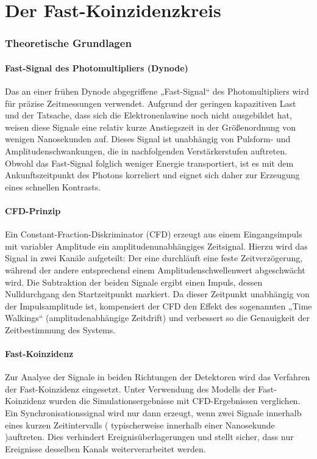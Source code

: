 \chapter{Der Fast-Koinzidenzkreis}
\subsection{Theoretische Grundlagen}
\subsubsection{Fast-Signal des Photomultipliers (Dynode)}
Das an einer frühen Dynode abgegriffene „Fast-Signal“ des Photomultipliers wird für präzise Zeitmessungen verwendet. Aufgrund der geringen kapazitiven Last und der Tatsache, dass sich die Elektronenlawine noch nicht ausgebildet hat, weisen diese Signale eine relativ kurze Anstiegszeit in der Größenordnung von wenigen Nanosekunden auf. Dieses Signal ist unabhängig von Pulsform- und Amplitudenschwankungen, die in nachfolgenden Verstärkerstufen auftreten. Obwohl das Fast-Signal folglich weniger Energie transportiert, ist es mit dem Ankunftszeitpunkt des Photons korreliert und eignet sich daher zur Erzeugung eines schnellen Kontrasts.
\subsubsection{CFD-Prinzip}
Ein Constant-Fraction-Diskriminator (CFD) erzeugt aus einem Eingangsimpuls mit variabler Amplitude ein amplitudenunabhängiges Zeitsignal. Hierzu wird das Signal in zwei Kanäle aufgeteilt: Der eine durchläuft eine feste Zeitverzögerung, während der andere entsprechend einem Amplitudenschwellenwert abgeschwächt wird. Die Subtraktion der beiden Signale ergibt einen Impuls, dessen Nulldurchgang den Startzeitpunkt markiert. Da dieser Zeitpunkt unabhängig von der Impulsamplitude ist, kompensiert der CFD den Effekt des sogenannten „Time Walkings“ (amplitudenabhängige Zeitdrift) und verbessert so die Genauigkeit der Zeitbestimmung des Systems.
\subsubsection{Fast-Koinzidenz}
Zur Analyse der Signale in beiden Richtungen der Detektoren wird das Verfahren der Fast-Koinzidenz eingesetzt. Unter Verwendung des Modells der Fast-Koinzidenz wurden die Simulationsergebnisse mit CFD-Ergebnissen verglichen. Ein Synchronisationssignal wird nur dann erzeugt, wenn zwei Signale innerhalb eines kurzen Zeitintervalls ( typischerweise innerhalb einer Nanosekunde )auftreten. Dies verhindert Ereignisüberlagerungen und stellt sicher, dass nur Ereignisse desselben Kanals weiterverarbeitet werden.
